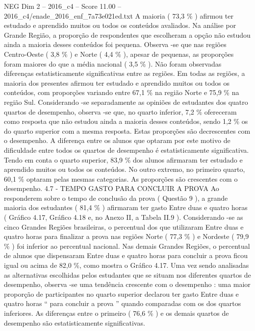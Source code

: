 \begin{textsample}{NEG Dim 2 – 2016\_c4 – Score 11.00 – 2016\_c4/enade\_2016\_enf\_7a73e021ed.txt}
A maioria ( 73,3 \% ) afirmou ter estudado e aprendido muitos ou todos os conteúdos avaliados.
Na análise por Grande Região, a proporção de respondentes que escolheram a opção não estudou ainda a maioria desses conteúdos foi pequena.
Observa -se que nas regiões Centro-Oeste ( 3,8 \% ) e Norte ( 4,4 \% ), apesar de pequenas, as proporções foram maiores do que a média nacional ( 3,5 \% ).
Não foram observadas diferenças estatisticamente significativas entre as regiões.
Em todas as regiões, a maioria dos presentes afirmou ter estudado e aprendido muitos ou todos os conteúdos, com proporções variando entre 67,1 \% na região Norte e 75,9 \% na região Sul.
Considerando -se separadamente as opiniões de estudantes dos quatro quartos de desempenho, observa -se que, no quarto inferior, 7,2 \% ofereceram como resposta que não estudou ainda a maioria desses conteúdos, sendo 1,2 \% os do quarto superior com a mesma resposta.
Estas proporções são decrescentes com o desempenho.
A diferença entre os alunos que optaram por este motivo de dificuldade entre todos os quartos de desempenho é estatisticamente significativa.
Tendo em conta o quarto superior, 83,9 \% dos alunos afirmaram ter estudado e aprendido muitos ou todos os conteúdos.
No outro extremo, no primeiro quarto, 60,1 \% optaram pelas mesmas categorias.
As proporções são crescentes com o desempenho. 4.7 - TEMPO GASTO PARA CONCLUIR A PROVA Ao responderem sobre o tempo de conclusão da prova ( Questão 9 ), a grande maioria dos estudantes ( 81,4 \% ) afirmaram ter gasto Entre duas e quatro horas ( Gráfico 4.17, Gráfico 4.18 e, no Anexo II, a Tabela II.9 ).
Considerando -se as cinco Grandes Regiões brasileiras, o percentual dos que utilizaram Entre duas e quatro horas para finalizar a prova nas regiões Norte ( 77,3 \% ) e Nordeste ( 79,9 \% ) foi inferior ao percentual nacional.
Nas demais Grandes Regiões, o percentual de alunos que dispensaram Entre duas e quatro horas para concluir a prova ficou igual ou acima de 82,0 \%, como mostra o Gráfico 4.17.
Uma vez sendo analisadas as alternativas escolhidas pelos estudantes que se situam nos diferentes quartos de desempenho, observa -se uma tendência crescente com o desempenho : uma maior proporção de participantes no quarto superior declarou ter gasto Entre duas e quatro horas “ para concluir a prova ” quando comparadas com os dos quartos inferiores.
As diferenças entre o primeiro ( 76,6 \% ) e os demais quartos de desempenho são estatisticamente significativas.

\end{textsample}
